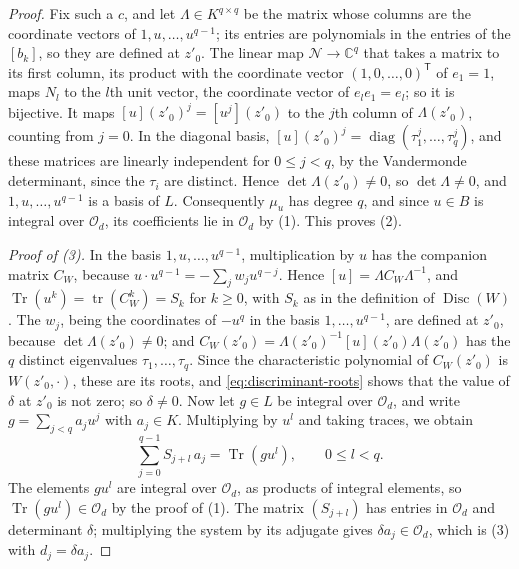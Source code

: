 \begin{proof}
Fix such a $c$, and let $\Lambda\in K^{q\times q}$ be the matrix whose columns are the coordinate vectors of $1,u,\ldots,u^{q-1}$; its entries are polynomials in the entries of the $[b_k]$, so they are defined at $z'_0$. The linear map $\mathcal N\to\mathbb C^q$ that takes a matrix to its first column, its product with the coordinate vector $(1,0,\ldots,0)^{\mathsf T}$ of $e_1=1$, maps $N_l$ to the $l$th unit vector, the coordinate vector of $e_le_1=e_l$; so it is bijective. It maps $[u](z'_0)^j=[u^j](z'_0)$ to the $j$th column of $\Lambda(z'_0)$, counting from $j=0$. In the diagonal basis, $[u](z'_0)^j=\operatorname{diag}(\tau_1^j,\ldots,\tau_q^j)$, and these matrices are linearly independent for $0\leq j<q$, by the Vandermonde determinant, since the $\tau_i$ are distinct. Hence $\det\Lambda(z'_0)\neq0$, so $\det\Lambda\neq0$, and $1,u,\ldots,u^{q-1}$ is a basis of $L$. Consequently $\mu_u$ has degree $q$, and since $u\in B$ is integral over $\mathcal O_d$, its coefficients lie in $\mathcal O_d$ by (1). This proves (2).

\emph{Proof of {\upshape(3)}.} In the basis $1,u,\ldots,u^{q-1}$, multiplication by $u$ has the companion matrix $C_W$, because $u\cdot u^{q-1}=-\sum_jw_ju^{q-j}$. Hence $[u]=\Lambda C_W\Lambda^{-1}$, and $\operatorname{Tr}(u^k)=\operatorname{tr}(C_W^k)=S_k$ for $k\geq0$, with $S_k$ as in the definition of $\operatorname{Disc}(W)$. The $w_j$, being the coordinates of $-u^q$ in the basis $1,\ldots,u^{q-1}$, are defined at $z'_0$, because $\det\Lambda(z'_0)\neq0$; and $C_W(z'_0)=\Lambda(z'_0)^{-1}[u](z'_0)\Lambda(z'_0)$ has the $q$ distinct eigenvalues $\tau_1,\ldots,\tau_q$. Since the characteristic polynomial of $C_W(z'_0)$ is $W(z'_0,\cdot)$, these are its roots, and \eqref{eq:discriminant-roots} shows that the value of $\delta$ at $z'_0$ is not zero; so $\delta\neq0$. Now let $g\in L$ be integral over $\mathcal O_d$, and write $g=\sum_{j<q}a_ju^j$ with $a_j\in K$. Multiplying by $u^l$ and taking traces, we obtain
\[
 \sum_{j=0}^{q-1}S_{j+l}\,a_j=\operatorname{Tr}(gu^l),\qquad0\leq l<q.
\]
The elements $gu^l$ are integral over $\mathcal O_d$, as products of integral elements, so $\operatorname{Tr}(gu^l)\in\mathcal O_d$ by the proof of (1). The matrix $(S_{j+l})$ has entries in $\mathcal O_d$ and determinant $\delta$; multiplying the system by its adjugate gives $\delta a_j\in\mathcal O_d$, which is (3) with $d_j=\delta a_j$.
\end{proof}

